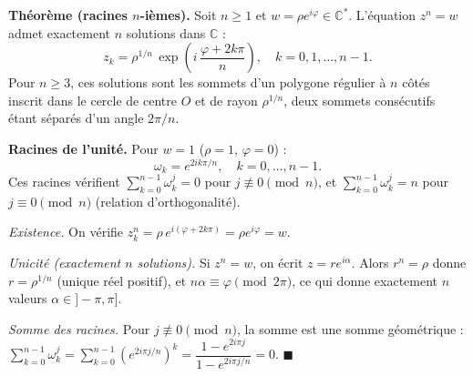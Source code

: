 \begin{tcolorbox}[thmbox]
  \textbf{Théorème (racines $n$-ièmes).}\enspace%
  Soit $n \geq 1$ et $w = \rho e^{i\varphi} \in \mathbb{C}^*$. L'équation
  $z^n = w$ admet exactement $n$ solutions dans $\mathbb{C}$ :
  \[
    z_k = \rho^{1/n}\, \exp\!\left(i\,\frac{\varphi + 2k\pi}{n}\right),
    \quad k = 0, 1, \ldots, n-1.
  \]
  Pour $n \geq 3$, ces solutions sont les sommets d'un polygone régulier à
  $n$ côtés inscrit dans le cercle de centre $O$ et de rayon $\rho^{1/n}$,
  deux sommets consécutifs étant séparés d'un angle $2\pi/n$.

  \medskip
  \textbf{Racines de l'unité.}\enspace%
  Pour $w = 1$ ($\rho = 1$, $\varphi = 0$) :
  \[
    \omega_k = e^{2ik\pi/n}, \quad k = 0, \ldots, n-1.
  \]
  Ces racines vérifient $\displaystyle\sum_{k=0}^{n-1} \omega_k^j = 0$
  pour $j \not\equiv 0 \pmod{n}$, et $\displaystyle\sum_{k=0}^{n-1} \omega_k^j = n$
  pour $j \equiv 0 \pmod{n}$ (relation d'orthogonalité).
\end{tcolorbox}

\begin{mdframed}[style=proofbar]
  \textit{Existence.} On vérifie $z_k^n = \rho\,e^{i(\varphi+2k\pi)} = \rho e^{i\varphi} = w$.

  \textit{Unicité (exactement $n$ solutions).} Si $z^n = w$, on écrit $z = r e^{i\alpha}$.
  Alors $r^n = \rho$ donne $r = \rho^{1/n}$ (unique réel positif), et
  $n\alpha \equiv \varphi \pmod{2\pi}$, ce qui donne exactement $n$ valeurs
  $\alpha \in {]-\pi, \pi]}$.

  \textit{Somme des racines.} Pour $j \not\equiv 0 \pmod{n}$, la somme est
  une somme géométrique :
  $\sum_{k=0}^{n-1} \omega_k^j = \sum_{k=0}^{n-1} (e^{2i\pi j/n})^k
  = \dfrac{1 - e^{2i\pi j}}{1 - e^{2i\pi j/n}} = 0$.
  \hfill$\blacksquare$
\end{mdframed}

\decsep{}


